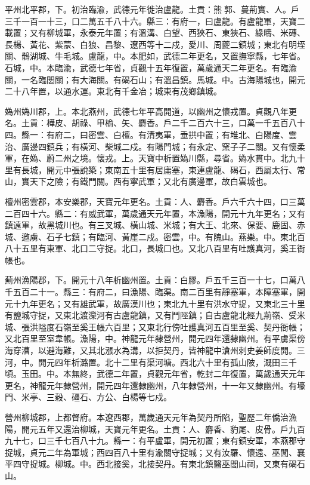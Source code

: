 \begin{pinyinscope}
 平州北平郡，下。初治臨渝，武德元年徙治盧龍。土貢：熊郭、蔓荊實、人。戶三千一百一十三，口二萬五千八十六。縣三：有府一，曰盧龍。有盧龍軍，天寶二載置；又有柳城軍，永泰元年置；有溫溝、白望、西狹石、東狹石、綠疇、米磚、長楊、黃花、紫蒙、白狼、昌黎、遼西等十二戍，愛川、周夔二鎮城；東北有明垤關、鶻湖城、牛毛城。盧龍，中。本肥如，武德二年更名，又置撫寧縣，七年省。石城，中。本臨渝，武德七年省，貞觀十五年復置，萬歲通天二年更名。有臨渝關，一名臨閭關；有大海關。有碣石山；有溫昌鎮。馬城。中。古海陽城也，開元二十八年置，以通水運。東北有千金冶；城東有茂鄉鎮城。



 媯州媯川郡，上。本北燕州，武德七年平高開道，以幽州之懷戎置。貞觀八年更名。土貢：樺皮、胡祿、甲榆、矢、麝香。戶二千二百六十三，口萬一千五百八十四。縣一：有府二，曰密雲、白檀。有清夷軍，垂拱中置；有堆北、白陽度、雲治、廣邊四鎮兵；有橫河、柴城二戍。有陽門城；有永定、窯子子二關。又有懷柔軍，在媯、蔚二州之境。懷戎。上。天寶中析置媯川縣，尋省。媯水貫中。北九十里有長城，開元中張說築；東南五十里有居庸塞，東連盧龍、碣石，西屬太行、常山，實天下之險；有鐵門關。西有寧武軍；又北有廣邊軍，故白雲城也。



 檀州密雲郡，本安樂郡，天寶元年更名。土貢：人、麝香。戶六千六十四，口三萬二百四十六。縣二：有威武軍，萬歲通天元年置，本漁陽，開元十九年更名；又有鎮遠軍，故黑城川也。有三叉城、橫山城、米城；有大王、北來、保要、鹿固、赤城、邀虜、石子七鎮；有臨河、黃崖二戍。密雲，中。有隗山。燕樂。中。東北百八十五里有東軍、北口二守捉。北口，長城口也。又北八百里有吐護真河，奚王衙帳也。



 薊州漁陽郡，下。開元十八年析幽州置。土貢：白膠。戶五千三百一十七，口萬八千五百二十一。縣三：有府二，曰漁陽、臨渠。南二百里有靜塞軍，本障塞軍，開元十九年更名；又有雄武軍，故廣漢川也；東北九十里有洪水守捉，又東北三十里有鹽城守捉，又東北渡灤河有古盧龍鎮，又有鬥陘鎮；自古盧龍北經九荊嶺、受米城、張洪隘度石嶺至奚王帳六百里；又東北行傍吐護真河五百里至奚、契丹衙帳；又北百里至室韋帳。漁陽，中。神龍元年隸營州，開元四年還隸幽州。有平虜渠傍海穿漕，以避海難，又其北漲水為溝，以拒契丹，皆神龍中滄州刺史姜師度開。三河，中。開元四年析潞置。北十二里有渠河塘。西北六十里有孤山陂，溉田三千頃。玉田。中。本無終，武德二年置，貞觀元年省，乾封二年復置，萬歲通天元年更名，神龍元年隸營州，開元四年還隸幽州，八年隸營州，十一年又隸幽州。有壕門、米亭、三穀、礓石、方公、白楊等七戍。



 營州柳城郡，上都督府。本遼西郡，萬歲通天元年為契丹所陷，聖歷二年僑治漁陽，開元五年又還治柳城，天寶元年更名。土貢：人、麝香、豹尾、皮骨。戶九百九十七，口三千七百八十九。縣一：有平盧軍，開元初置；東有鎮安軍，本燕郡守捉城，貞元二年為軍城；西四百八十里有渝關守捉城；又有汝羅、懷遠、巫閭、襄平四守捉城。柳城。中。西北接奚，北接契丹。有東北鎮醫巫閭山祠，又東有碣石山。




\end{pinyinscope}
